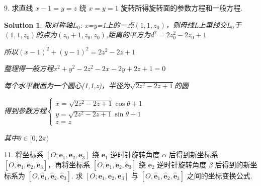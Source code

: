 \documentclass[a4paper,12pt]{article}
\newtheorem*{sol}{Solution}
\begin{document}
9. 求直线 $x-1 = y = z$ 绕 $x = y = 1$ 旋转所得旋转面的参数方程和一般方程.

\begin{sol}
    取对称轴$L_0$: x=y=1上的一点$(1,1,z_0)$，则母线L上垂线交$L_0$于$(1,1,z_0)$的点为$(z_0+1,z_0,z_0)$,距离的平方为$d^2=2z_0^2-2z_0+1$

    所以$(x-1)^2+(y-1)^2=2z^2-2z+1$

    整理得一般方程$x^2+y^2-2z^2-2x-2y+2z+1=0$

    每个水平截面为一个圆心(1,1,z)，半径为$\sqrt{2z^2-2z+1}$的圆

    得到参数方程$\begin{cases}
            x=\sqrt{2z^2-2z+1}\cos\theta+1 \\
            y=\sqrt{2z^2-2z+1}\sin\theta+1 \\
            z=z
        \end{cases}$

    其中$\theta\in[0,2\pi)$
\end{sol}

11. 将坐标系 $[O;\boldsymbol{e}_1,\boldsymbol{e}_2,\boldsymbol{e}_3]$ 绕 $\boldsymbol{e}_1$ 逆时针旋转角度 $\alpha$ 后得到新坐标系 $[O,\tilde{\boldsymbol{e}}_1,\tilde{\boldsymbol{e}}_2,\tilde{\boldsymbol{e}}_3]$，再将坐标系 $[O,\tilde{\boldsymbol{e}}_1,\tilde{\boldsymbol{e}}_2,\tilde{\boldsymbol{e}}_3]$ 绕 $\boldsymbol{e}_2$ 逆时针旋转角度 $\beta$ 后得到的新坐标系为 $[O,\hat{\boldsymbol{e}}_1,\hat{\boldsymbol{e}}_2,\hat{\boldsymbol{e}}_3]$. 求 $[O;\boldsymbol{e}_1,\boldsymbol{e}_2,\boldsymbol{e}_3]$ 与 $[O,\hat{\boldsymbol{e}}_1,\hat{\boldsymbol{e}}_2,\hat{\boldsymbol{e}}_3]$ 之间的坐标变换公式.
\end{document}
